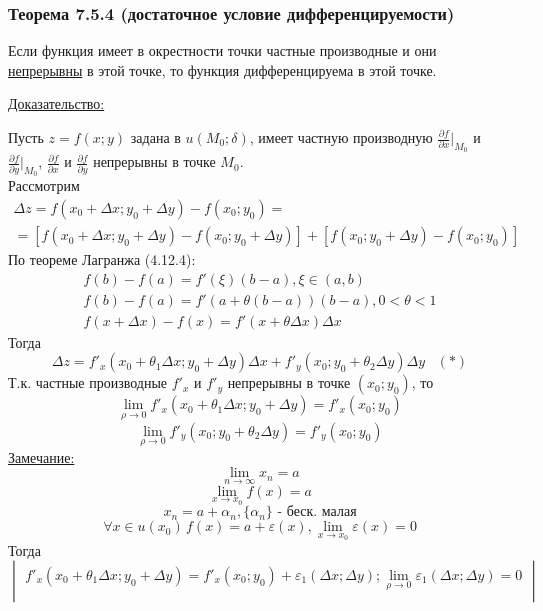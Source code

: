 \documentclass[12pt]{article}
\begin{document}
    \subsubsection*{Теорема 7.5.4 (достаточное условие дифференцируемости)}\label{th:7.5.4}
    Если функция имеет в окрестности точки частные производные и они \underline{непрерывны} в этой точке, то функция дифференцируема в этой точке.\par\noindent
    \underline{Доказательство:}
    \begin{adjustwidth}{1.5em}{1.5em}
        Пусть $z = f(x;y)$ задана в $u(M_0; \delta)$, имеет частную производную $\frac{\partial f}{\partial x} \Big|_{M_0}$ и $\frac{\partial f}{\partial y} \Big|_{M_0}$, $\frac{\partial f}{\partial x}$ и $\frac{\partial f}{\partial y}$ непрерывны в точке $M_0$.\\
        Рассмотрим
        \begin{gather*}
            \Delta z = f(x_0 + \Delta x; y_0 + \Delta y) - f(x_0; y_0) =\\
            = [ f(x_0 + \Delta x; y_0 + \Delta y) - f(x_0; y_0 + \Delta y) ] + [f(x_0; y_0 + \Delta y) - f(x_0; y_0)]
        \end{gather*}
        По теореме Лагранжа (4.12.4):
        \begin{gather*}
            f(b) - f(a) = f'(\xi)(b-a), \xi \in (a, b)\\
            f(b) - f(a) = f'(a + \theta(b-a))(b-a), 0 < \theta < 1\\
            f(x + \Delta x) - f(x) = f'(x + \theta \Delta x) \Delta x
        \end{gather*}
        Тогда
        \[ \Delta z = f'_x (x_0 + \theta_1 \Delta x; y_0 + \Delta y)\Delta x + f'_y(x_0; y_0 + \theta_2 \Delta y)\Delta y\,\,\,\,\, (*) \]
        Т.к. частные производные $f'_x$ и $f'_y$ непрерывны в точке $(x_0; y_0)$, то
        \[ \lim_{\rho \to 0} f'_x(x_0 + \theta_1 \Delta x; y_0 + \Delta y) = f'_x(x_0; y_0) \]
        \[ \lim_{\rho \to 0} f'_y(x_0; y_0 + \theta_2 \Delta y) = f'_y(x_0; y_0) \]
        \underline{Замечание:}
        \[ \lim_{n\to\infty} x_n = a \]
        \[ \lim_{x \to x_0} f(x) = a \]
        \[ x_n = a + \alpha_n, \{ \alpha_n \}\text{ - беск. малая} \]
        \[ \forall x \in u(x_0)\, f(x) = a + \varepsilon(x), \lim_{x\to x_0} \varepsilon(x) = 0 \]
        Тогда
        \[ \begin{vmatrix}
            f'_x(x_0 + \theta_1 \Delta x; y_0 + \Delta y) = f'_x (x_0; y_0) + \varepsilon_1 (\Delta x; \Delta y); \lim_{\rho \to 0} \varepsilon_1(\Delta x; \Delta y) = 0\\

\end{vmatrix}\]
\end{adjustwidth}
\end{document}
